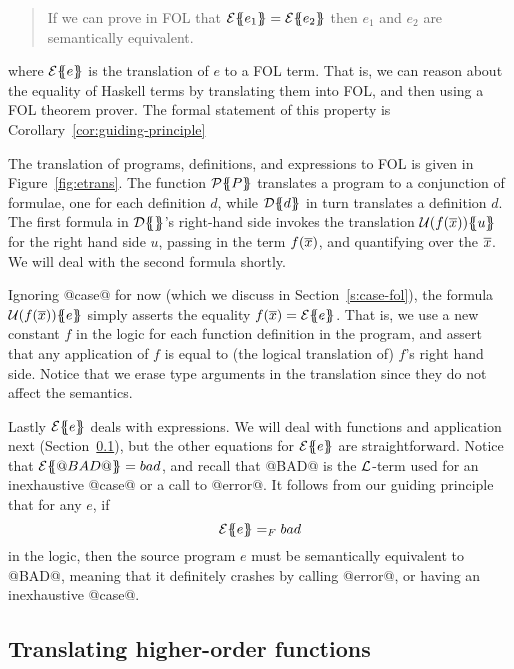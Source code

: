 \begin{quote}
If we can prove in FOL that $\etrans{}{}{e_1} = \etrans{}{}{e_2}$ then
$e_1$ and $e_2$ are semantically equivalent.
\end{quote}

where $\etrans{}{}{e}$ is the translation of $e$ to a FOL term. That is, we can
reason about the equality of Haskell terms by translating them into FOL, and then using
a FOL theorem prover. The formal statement of this property is Corollary~\ref{cor:guiding-principle}
 

The translation of programs, definitions, and expressions to FOL
is given in Figure~\ref{fig:etrans}.
The function $\ptrans{}{P}$ translates a program to a conjunction of formulae,
one for each definition $d$, while $\dtrans{}{d}$ in turn translates
a definition $d$.
The first formula in $\dtrans{}{}$'s right-hand side invokes the translation
$\utrans{}{u}{f(\ol{x})}$ for the right hand side $u$, passing in the term $f(\ol{x})$,
and quantifying over the $\ol{x}$.  We will deal with the second formula shortly.


Ignoring @case@ for now (which we discuss in Section~\ref{s:case-fol}),
the formula $\utrans{}{e}{f(\ol{x})}$
simply asserts the equality $f(\ol{x}) = \etrans{}{}{e}$.
That is, we use a new constant $f$ in the logic for each function definition in the
program, and assert that any application of $f$ is equal to (the logical translation of)
$f$'s right hand side. Notice that we erase type arguments in the translation
since they do not affect the semantics.

Lastly $\etrans{}{}{e}$ deals with expressions.  We will deal with
functions and application next
(Section~\ref{s:hof}), but the other equations for $\etrans{}{}{e}$
are straightforward.  Notice that $\etrans{}{}{@BAD@} = bad$, and recall
that @BAD@ is the $\cal L$-term used for an inexhaustive @case@ or a call
to @error@.  It follows from our guiding principle
that for any $e$, if
$$ \etrans{}{}{e} =_F bad $$
in the logic, then the source program $e$
must be semantically equivalent to @BAD@, meaning that it definitely
crashes by calling @error@, or having an inexhaustive @case@.


\subsection{Translating higher-order functions} \label{s:hof}

